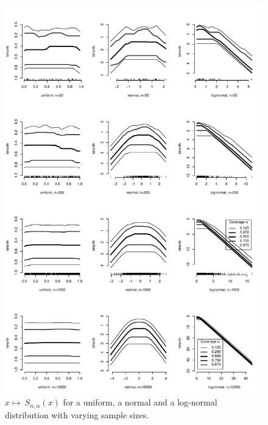 \documentclass[dvips,12pt,a4paper,twoside]{amsart}
\begin{document}
%
%
\begin{figure}[htb]
\includegraphics[width=1.0\linewidth]{TheShorthPlot-s05unlnalpha}
\caption{ $x \mapsto  \ S_{n, \alpha}(x)$
 for a uniform, a normal and a log-normal distribution with varying sample sizes.}
\label{fig:s05unlnalpha}
\end{figure}
\end{document}
